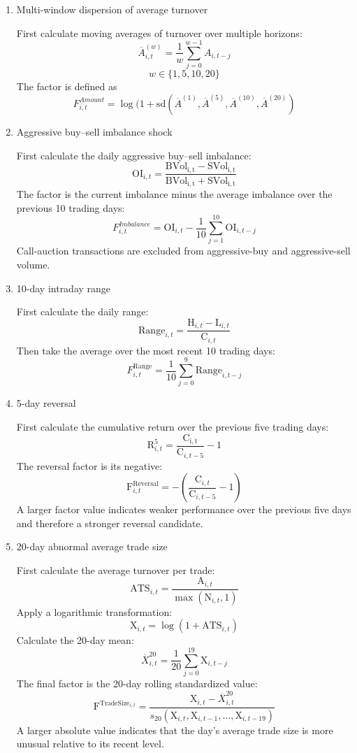 \documentclass[a4paper,11pt,openany]{report}
\begin{document}
\begin{enumerate}[label=\roman*)]
    \item Multi-window dispersion of average turnover

    First calculate moving averages of turnover over multiple horizons:
    $$\overline A^({w})_{i,t}=\frac{1}{w} \sum_{j=0}^{w-1}A_{i,t-j}$$
    $$w \in\{1,5,10,20\}$$
    The factor is defined as
    $$F^{Amount}_{i,t} = \log(1+\mathrm{sd}(\overline A^{(1)}, \overline A^{(5)},\overline A^{(10)},\overline A^{(20)})$$

    \item Aggressive buy--sell imbalance shock

    First calculate the daily aggressive buy--sell imbalance:
    $$\mathrm{OI}_{i,t} = \frac{\mathrm{BVol_{i,t}-\mathrm{SVol_{i,t}}}}{\mathrm{BVol_{i,t}+\mathrm{SVol_{i,t}}}}$$
    The factor is the current imbalance minus the average imbalance over the previous 10 trading days:
    $$F^{Imbalance}_{i,t}=\mathrm{OI}_{i,t}-\frac{1}{10}\sum_{j=1}^{10}\mathrm{OI}_{i,t-j}$$
    Call-auction transactions are excluded from aggressive-buy and aggressive-sell volume.

    \item 10-day intraday range

    First calculate the daily range:
    $$\mathrm{Range}_{i,t}=\frac{\mathrm{H}_{i,t}-\mathrm{L}_{i,t}}{\mathrm{C}_{i,t}}$$
    Then take the average over the most recent 10 trading days:
    $$F^{\mathrm{Range}}_{i,t}=\frac{1}{10}\sum_{j=0}^{9}\mathrm{Range}_{i,t-j}$$

    \item 5-day reversal

    First calculate the cumulative return over the previous five trading days:
    $$\mathrm{R}^{5}_{i,t} = \frac{\mathrm{C_{i,t}}}{\mathrm{C}_{i,t-5}}-1$$
    The reversal factor is its negative:
    $$\mathrm{F}^{\mathrm{Reversal}}_{i,t}=-(\frac{\mathrm{C}_{i,t}}{\mathrm{C}_{i,t-5}}-1)$$
    A larger factor value indicates weaker performance over the previous five days and therefore a stronger reversal candidate.

    \item 20-day abnormal average trade size

    First calculate the average turnover per trade:
    $$\mathrm{ATS}_{i,t}=\frac{\mathrm{A}_{i,t}}{\max(\mathrm{N}_{i,t},1)}$$
    Apply a logarithmic transformation:
    $$\mathrm{X}_{i,t}=\log(1+\mathrm{ATS}_{i,t})$$
    Calculate the 20-day mean:
    $$\overline{X}^{20}_{i,t}=\frac{1}{20}\sum^{19}_{j=0}\mathrm{X}_{i,t-j}$$
    The final factor is the 20-day rolling standardized value:
    $$\mathrm{F}^{\mathrm{TradeSize}_{i,t}}=\frac{\mathrm{X}_{i,t}-\overline{X}^{20}_{i,t}}{s_{20}(\mathrm{X}_{i,t},\mathrm{X}_{i,t-1},...,\mathrm{X}_{i,t-19})}$$
    A larger absolute value indicates that the day's average trade size is more unusual relative to its recent level.


\end{enumerate}
\end{document}
